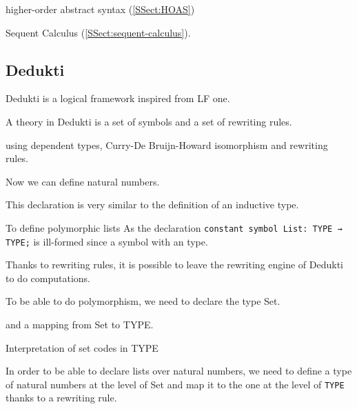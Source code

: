 \documentclass{article}
\begin{document}
	higher-order abstract syntax (\autoref{SSect:HOAS})

	Sequent Calculus (\autoref{SSect:sequent-calculus}).

	\subsection{Dedukti}\label{SSect:Dedukti}
	
	Dedukti is a logical framework inspired from LF one.
	
	A theory in Dedukti is a set of symbols and a set of rewriting rules.
	
	using dependent types, Curry-De Bruijn-Howard isomorphism and rewriting rules.
	

	
	
	Now we can define natural numbers.
	
	
	
	This declaration is very similar to the definition of an inductive type.
	
	
	To define polymorphic lists
	As the declaration \lstinline[language=Dialekto, firstnumber=last]|constant symbol List: TYPE → TYPE;| is ill-formed since  a symbol with an  type.
	
	
	Thanks to rewriting rules, it is possible to leave the rewriting engine of Dedukti to do computations.
	
	To be able to do polymorphism, we need to declare the type \textsf{Set}.
	
	
	
	and a mapping from \textsf{Set} to TYPE.
	
	Interpretation of set codes in TYPE
	
	
	
	

	
	
	
	
	
	
	
	In order to be able to declare lists over natural numbers, we need to define a type of natural numbers at the level of \textsf{Set} and map it to the one at the level of \lstinline[language=Dialekto, firstnumber=last]|TYPE| thanks to a rewriting rule.
	
\end{document}
